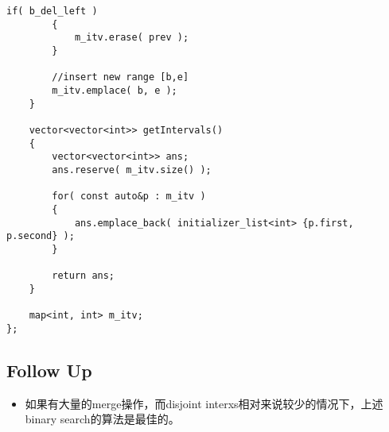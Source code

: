 \begin{lstlisting}[style=customc, caption={Binary Search}]
        if( b_del_left )
        {
            m_itv.erase( prev );
        }

        //insert new range [b,e]
        m_itv.emplace( b, e );
    }

    vector<vector<int>> getIntervals()
    {
        vector<vector<int>> ans;
        ans.reserve( m_itv.size() );

        for( const auto&p : m_itv )
        {
            ans.emplace_back( initializer_list<int> {p.first, p.second} );
        }

        return ans;
    }

    map<int, int> m_itv;
};
\end{lstlisting}

\subsection{Follow Up}
\begin{itemize}
\item 如果有大量的merge操作，而disjoint interxs相对来说较少的情况下，上述binary search的算法是最佳的。
\end{itemize}